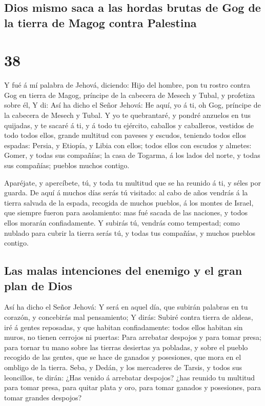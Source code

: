 \hypertarget{dios-mismo-saca-a-las-hordas-brutas-de-gog-de-la-tierra-de-magog-contra-palestina}{%
\subsection{Dios mismo saca a las hordas brutas de Gog de la tierra de
Magog contra
Palestina}\label{dios-mismo-saca-a-las-hordas-brutas-de-gog-de-la-tierra-de-magog-contra-palestina}}

\hypertarget{section-37}{%
\section{38}\label{section-37}}

 Y fué á mí palabra de Jehová, diciendo: 
Hijo del hombre, pon tu rostro contra Gog en tierra de Magog, príncipe
de la cabecera de Mesech y Tubal, y profetiza sobre él,  Y
di: Así ha dicho el Señor Jehová: He aquí, yo á ti, oh Gog, príncipe de
la cabecera de Mesech y Tubal.  Y yo te quebrantaré, y
pondré anzuelos en tus quijadas, y te sacaré á ti, y á todo tu ejército,
caballos y caballeros, vestidos de todo todos ellos, grande multitud con
paveses y escudos, teniendo todos ellos espadas:  Persia,
y Etiopía, y Libia con ellos; todos ellos con escudos y almetes:
 Gomer, y todas sus compañías; la casa de Togarma, á los
lados del norte, y todas sus compañías; pueblos muchos contigo.

 Aparéjate, y apercíbete, tú, y toda tu multitud que se ha
reunido á ti, y séles por guarda.  De aquí á muchos días
serás tú visitado: al cabo de años vendrás á la tierra salvada de la
espada, recogida de muchos pueblos, á los montes de Israel, que siempre
fueron para asolamiento: mas fué sacada de las naciones, y todos ellos
morarán confiadamente.  Y subirás tú, vendrás como
tempestad; como nublado para cubrir la tierra serás tú, y todas tus
compañías, y muchos pueblos contigo.

\hypertarget{las-malas-intenciones-del-enemigo-y-el-gran-plan-de-dios}{%
\subsection{Las malas intenciones del enemigo y el gran plan de
Dios}\label{las-malas-intenciones-del-enemigo-y-el-gran-plan-de-dios}}

 Así ha dicho el Señor Jehová: Y será en aquel día, que
subirán palabras en tu corazón, y concebirás mal pensamiento;
 Y dirás: Subiré contra tierra de aldeas, iré á gentes
reposadas, y que habitan confiadamente: todos ellos habitan sin muros,
no tienen cerrojos ni puertas:  Para arrebatar despojos y
para tomar presa; para tornar tu mano sobre las tierras desiertas ya
pobladas, y sobre el pueblo recogido de las gentes, que se hace de
ganados y posesiones, que mora en el ombligo de la tierra.
 Seba, y Dedán, y los mercaderes de Tarsis, y todos sus
leoncillos, te dirán: ¿Has venido á arrebatar despojos? ¿has reunido tu
multitud para tomar presa, para quitar plata y oro, para tomar ganados y
posesiones, para tomar grandes despojos?


